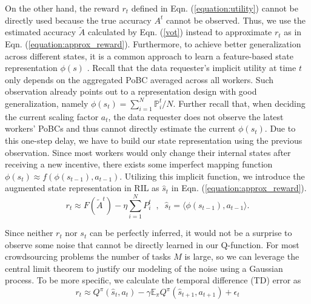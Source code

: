 \documentclass{article}
\begin{document}
On the other hand, the reward $r_t$ defined in Eqn. (\ref{equation:utility}) cannot be directly used because the true accuracy $A^t$ cannot be observed.
Thus, we use the estimated accuracy $\tilde{A}$ calculated by Eqn. (\ref{vot}) instead to approximate $r_t$ as in Eqn. (\ref{equation:approx_reward}).
Furthermore, to achieve better generalization across different states, it is a common approach to learn a feature-based state representation $\phi(s)$ \cite{Mnih15, Liang16}. Recall that the data requester's implicit utility at time $t$ only depends on the aggregated PoBC averaged across all workers. Such observation already points out to a  representation design with good generalization, namely 
$\phi(s_t) = {\sum}_{i=1}^N \mathbb{P}^t_i/N$.
Further recall that, when deciding the current scaling factor $a_t$, the data requester does not observe the latest workers' PoBCs and thus cannot directly estimate the current $\phi(s_t)$. Due to this one-step delay, we have to build our state representation using the previous observation. Since most workers would only change their internal states after receiving a new incentive, there exists some imperfect mapping function $\phi(s_{t}) \approx f(\phi(s_{t-1}),a_{t-1})$. %
Utilizing this implicit function, we introduce the augmented state representation in RIL as $\hat{s}_t$ in Eqn. (\ref{equation:approx_reward}).
\begin{equation}
\label{equation:approx_reward}
r_t\approx F(\tilde{A}^t) - \eta {\sum}_{i=1}^{N}P^t_i\;\;,\;\;\hat{s}_t = \langle \phi(s_{t-1}), a_{t-1} \rangle.
\end{equation}


Since neither $r_t$ nor $s_t$ can be perfectly inferred, it would not be a surprise to observe some noise that cannot be directly learned in our Q-function. %
For most crowdsourcing problems the number of tasks $M$ is large, so we can leverage the central limit theorem to justify our modeling of the noise using a Gaussian process.
To be more specific, we calculate the temporal difference (TD) error as 
\begin{equation}
r_t \approx Q^\pi(\hat{s}_t, a_t) - \gamma \mathbb{E}_{\pi}Q^{\pi}(\hat{s}_{t+1},a_{t+1}) + \epsilon_t 
\end{equation}
\end{document}
